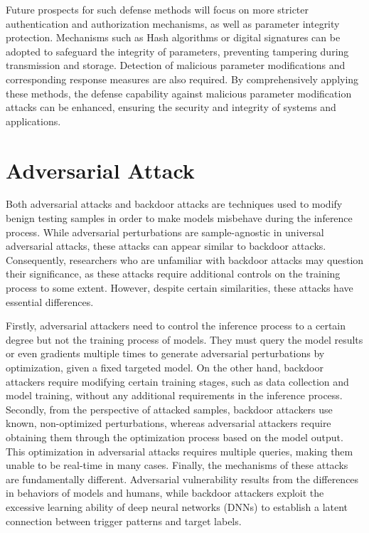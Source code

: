 \documentclass[a4paper,fleqn]{cas-dc}
\begin{document}
Future prospects for such defense methods will
focus on more stricter authentication and authorization
mechanisms, as well as parameter integrity protection.
Mechanisms such as Hash algorithms or digital signatures
can be adopted to safeguard the integrity of parameters,
preventing tampering during transmission and storage.
Detection of malicious parameter modifications and
corresponding response measures are also required.
By comprehensively applying these methods, the defense capability
against malicious parameter modification attacks can be
enhanced, ensuring the security and integrity of systems
and applications.

\section{Adversarial Attack}
Both adversarial attacks and backdoor attacks are
techniques used to modify benign testing samples in order
to make models misbehave during the inference process.
While adversarial perturbations are sample-agnostic in
universal adversarial attacks, these attacks can appear
similar to backdoor attacks. Consequently, researchers
who are unfamiliar with backdoor attacks may question
their significance, as these attacks require additional
controls on the training process to some extent. However,
despite certain similarities, these attacks have essential
differences.

Firstly, adversarial attackers need to control the
inference process to a certain degree but not the training
process of models. They must query the model results
or even gradients multiple times to generate adversarial
perturbations by optimization, given a fixed targeted
model. On the other hand, backdoor attackers require
modifying certain training stages, such as data collection
and model training, without any additional requirements
in the inference process. Secondly, from the perspective
of attacked samples, backdoor attackers use known,
non-optimized perturbations, whereas adversarial attackers
require obtaining them through the optimization process
based on the model output. This optimization in
adversarial attacks requires multiple queries, making them unable
to be real-time in many cases. Finally, the mechanisms
of these attacks are fundamentally different. Adversarial
vulnerability results from the differences in behaviors of
models and humans, while backdoor attackers exploit the
excessive learning ability of deep neural networks (DNNs)
to establish a latent connection between trigger patterns
and target labels.
\end{document}
